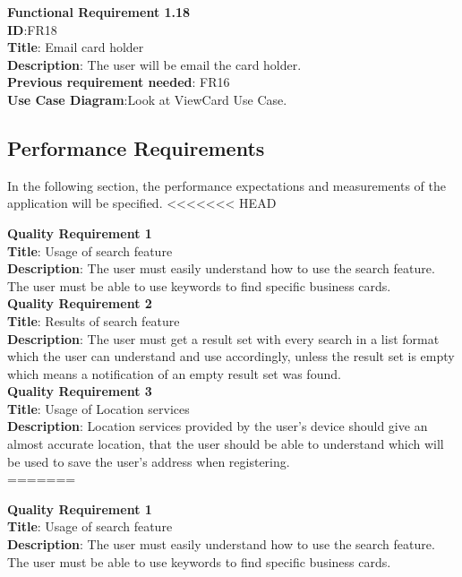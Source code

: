 \documentclass[english]{article}
\begin{document}
				\textbf{Functional Requirement 1.18}\\
				\textbf{ID}:FR18\\
				\textbf{Title}: Email card holder\\
				\textbf{Description}: The user will be email the card holder.\\
				\textbf{Previous requirement needed}: FR16\\
				\textbf{Use Case Diagram}:Look at ViewCard Use Case.
				
				\subsection{Performance Requirements}
				In the following section, the performance expectations and measurements of the application will be specified.
<<<<<<< HEAD
				
				\textbf{Quality Requirement 1}\\
				\textbf{Title}: Usage of search feature\\
				\textbf{Description}: The user must easily understand how to use the search feature. The user must be able to use keywords to find specific business cards.\\
				
				\textbf{Quality Requirement 2}\\
				\textbf{Title}: Results of search feature\\
				\textbf{Description}: The user must get a result set with every search in a list format which the user can understand and use accordingly, unless the result set is empty which means a notification of an empty result set was found.\\
				
				\textbf{Quality Requirement 3}\\
				\textbf{Title}: Usage of Location services\\
				\textbf{Description}: Location services provided by the user's device should give an almost accurate location, that the user should be able to understand which will be used to save the user's address when registering.\\
				
=======
				
				\textbf{Quality Requirement 1}\\
				\textbf{Title}: Usage of search feature\\
				\textbf{Description}: The user must easily understand how to use the search feature. The user must be able to use keywords to find specific business cards.\\
				
\end{document}
